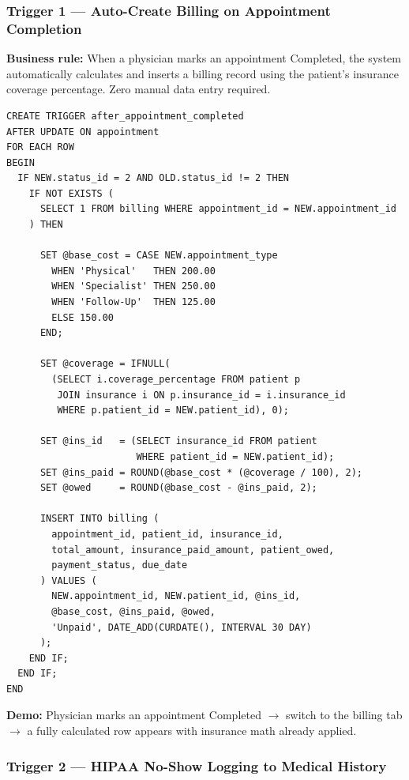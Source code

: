 \documentclass[12pt, letterpaper]{article}
\begin{document}
\subsubsection{Trigger 1 — Auto-Create Billing on Appointment Completion}

\textbf{Business rule:} When a physician marks an appointment Completed, the system automatically calculates and inserts a billing record using the patient's insurance coverage percentage. Zero manual data entry required.

\begin{lstlisting}[language=MySQL, caption={Trigger 1: after\_appointment\_completed}]
CREATE TRIGGER after_appointment_completed
AFTER UPDATE ON appointment
FOR EACH ROW
BEGIN
  IF NEW.status_id = 2 AND OLD.status_id != 2 THEN
    IF NOT EXISTS (
      SELECT 1 FROM billing WHERE appointment_id = NEW.appointment_id
    ) THEN

      SET @base_cost = CASE NEW.appointment_type
        WHEN 'Physical'   THEN 200.00
        WHEN 'Specialist' THEN 250.00
        WHEN 'Follow-Up'  THEN 125.00
        ELSE 150.00
      END;

      SET @coverage = IFNULL(
        (SELECT i.coverage_percentage FROM patient p
         JOIN insurance i ON p.insurance_id = i.insurance_id
         WHERE p.patient_id = NEW.patient_id), 0);

      SET @ins_id   = (SELECT insurance_id FROM patient
                       WHERE patient_id = NEW.patient_id);
      SET @ins_paid = ROUND(@base_cost * (@coverage / 100), 2);
      SET @owed     = ROUND(@base_cost - @ins_paid, 2);

      INSERT INTO billing (
        appointment_id, patient_id, insurance_id,
        total_amount, insurance_paid_amount, patient_owed,
        payment_status, due_date
      ) VALUES (
        NEW.appointment_id, NEW.patient_id, @ins_id,
        @base_cost, @ins_paid, @owed,
        'Unpaid', DATE_ADD(CURDATE(), INTERVAL 30 DAY)
      );
    END IF;
  END IF;
END
\end{lstlisting}

\textbf{Demo:} Physician marks an appointment Completed $\rightarrow$ switch to the billing tab $\rightarrow$ a fully calculated row appears with insurance math already applied.

\subsubsection{Trigger 2 — HIPAA No-Show Logging to Medical History}
\end{document}
